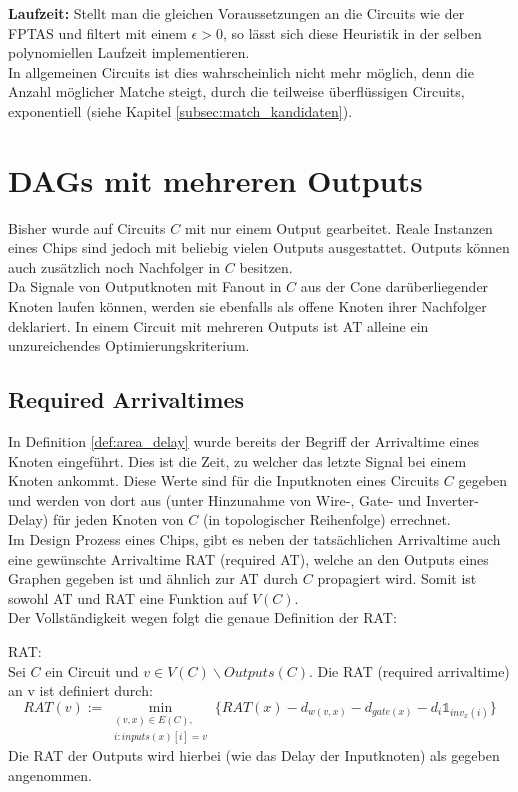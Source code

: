 \documentclass[11pt, a4paper, german]{article}
\begin{document}
{\bf Laufzeit: } Stellt man die gleichen Voraussetzungen an die Circuits wie der FPTAS und filtert mit einem $\epsilon  > 0$, so lässt sich diese Heuristik in der selben polynomiellen Laufzeit implementieren.\\
In allgemeinen Circuits ist dies wahrscheinlich nicht mehr möglich, denn die Anzahl möglicher Matche steigt, durch die teilweise überflüssigen Circuits, exponentiell  (siehe Kapitel \ref{subsec:match_kandidaten}).



\section{DAGs mit mehreren Outputs}
\label{sec:outputs}
Bisher wurde auf Circuits $C$ mit nur einem Output gearbeitet. Reale Instanzen eines Chips sind jedoch mit beliebig vielen Outputs ausgestattet. Outputs können auch zusätzlich noch Nachfolger in $C$ besitzen. \\

 Da Signale von Outputknoten mit Fanout in $C$ aus der Cone darüberliegender Knoten laufen können, werden sie ebenfalls als offene Knoten ihrer Nachfolger deklariert. In einem Circuit mit mehreren Outputs ist AT alleine ein unzureichendes Optimierungskriterium.
\subsection{Required Arrivaltimes}
\label{subsec:rat}
In Definition \ref{def:area_delay} wurde bereits der Begriff der Arrivaltime eines Knoten eingeführt. Dies ist die Zeit, zu welcher das letzte Signal bei einem Knoten ankommt. Diese Werte sind für die Inputknoten eines Circuits $C$ gegeben und werden von dort aus (unter Hinzunahme von Wire-, Gate- und Inverter-Delay) für jeden Knoten von $C$ (in topologischer Reihenfolge) errechnet.\\
Im Design Prozess eines Chips, gibt es neben der tatsächlichen Arrivaltime auch eine  gewünschte Arrivaltime RAT (required AT), welche an den Outputs eines Graphen gegeben ist und ähnlich zur AT durch $C$ propagiert wird. Somit ist sowohl AT und RAT eine Funktion auf $V(C)$. \\
Der Vollständigkeit wegen folgt die genaue Definition der RAT:\\

\begin{definition}{RAT:}\\
	Sei $C$ ein Circuit und $v \in V(C)\backslash  Outputs(C)$. Die RAT (required arrivaltime) an v ist definiert durch:
	\[   RAT(v) := \min\limits_{ \substack{(v,x)\in E(C), \\ i: inputs(x)[i] = v }} \{ RAT(x) - d_{w(v,x)} - d_{gate(x)} - d_{i} \mathbb{1}_{inv_x(i)} \}\] 
	Die RAT der Outputs wird hierbei (wie das Delay der Inputknoten) als gegeben angenommen. 
\end{definition}
\end{document}
